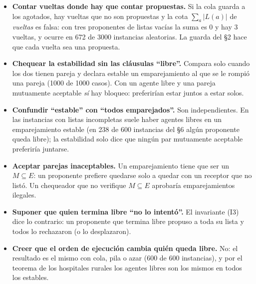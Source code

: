 \documentclass[11pt]{article}
\begin{document}
\begin{alertarota}
\begin{itemize}[leftmargin=14pt]
\item \textbf{Contar vueltas donde hay que contar propuestas.} Si la cola guarda a los agotados, hay vueltas que no
son propuestas y la cota $\sum_a|L(a)|$ de \emph{vueltas} es falsa: con tres proponentes de listas vacías la suma
es $0$ y hay $3$ vueltas, y ocurre en 672 de 3000 instancias aleatorias. La guarda del §2 hace que cada
vuelta sea una propuesta.
\item \textbf{Chequear la estabilidad sin las cláusulas ``libre''.} Compara solo cuando los dos tienen pareja y
declara estable un emparejamiento al que se le rompió una pareja (1000 de 1000 casos). Con un
agente libre y una pareja mutuamente aceptable \emph{sí} hay bloqueo: preferirían estar juntos a estar solos.
\item \textbf{Confundir ``estable'' con ``todos emparejados''.} Son independientes. En las instancias con listas
incompletas suele haber agentes libres en un emparejamiento estable (en 238 de 600 instancias del §6 algún
proponente queda libre); la estabilidad solo dice que ningún par mutuamente aceptable preferiría juntarse.
\item \textbf{Aceptar parejas inaceptables.} Un emparejamiento tiene que ser un $M\subseteq E$: un proponente
prefiere quedarse solo a quedar con un receptor que no listó. Un chequeador que no verifique $M\subseteq E$ aprobaría emparejamientos ilegales.
\item \textbf{Suponer que quien termina libre ``no lo intentó''.} El invariante (I3) dice lo contrario: un
proponente que termina libre propuso a toda su lista y todos lo rechazaron (o lo desplazaron).
\item \textbf{Creer que el orden de ejecución cambia quién queda libre.} No: el resultado es el mismo con cola,
pila o azar (600 de 600 instancias), y por el teorema de los hospitales rurales los agentes libres son
los mismos en todos los estables.
\end{itemize}
\end{alertarota}
\end{document}
